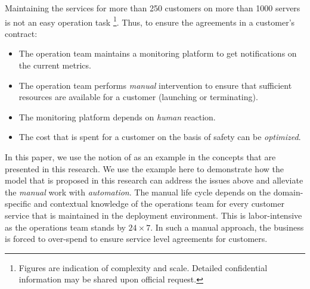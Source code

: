 Maintaining the services for more than 250 customers on more than 1000 servers is not an easy operation task
\footnote{Figures are indication of complexity and scale. Detailed confidential information may be shared upon official request.}.
Thus, to ensure the agreements in a customer's contract:
\begin{itemize}
\item The operation team maintains a monitoring platform to get notifications on the current metrics.
\item The operation team performs \emph{manual} intervention to ensure that sufficient resources are available for a customer (launching or terminating).
\item The monitoring platform depends on \emph{human} reaction.
\item The cost that is spent for a customer on the basis of safety can be \emph{optimized}.
\end{itemize}

In this paper, we use the notion of \qps as an example in the concepts that are presented in this research. 
We use the example here to demonstrate how the model that is proposed in this research can address the issues above and alleviate the \emph{manual} work with \emph{automation}. 
The manual life cycle depends on the domain-specific and contextual knowledge of the operations team for every customer service that is maintained in the deployment environment.
This is labor-intensive as the operations team stands by $24\times7$.
In such a manual approach, the business is forced to over-spend to ensure service level agreements for customers. 
